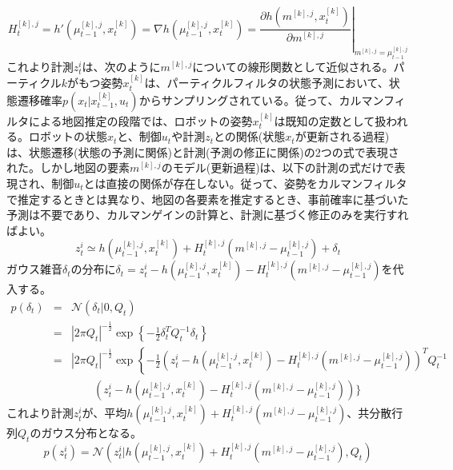 \documentclass[dvipdfmx,a4paper]{jsarticle}
\begin{document}
\begin{equation}
	H_t^{[k], j} = h'(\mu_{t - 1}^{[k], j}, x_t^{[k]}) = \nabla h(\mu_{t - 1}^{[k], j}, x_t^{[k]}) = \left. \frac{\partial h(m^{[k], j}, x_t^{[k]})}{\partial m^{[k], j}} \right|_{m^{[k], j} = \mu_{t - 1}^{[k], j}}
\end{equation}
これより計測$z_t^i$は、次のように$m^{[k], j}$についての線形関数として近似される。パーティクル$k$がもつ姿勢$x_t^{[k]}$は、パーティクルフィルタの状態予測において、状態遷移確率$p(x_t | x_{t - 1}^{[k]}, u_t)$からサンプリングされている。従って、カルマンフィルタによる地図推定の段階では、ロボットの姿勢$x_t^{[k]}$は既知の定数として扱われる。ロボットの状態$x_t$と、制御$u_t$や計測$z_t$との関係(状態$x_t$が更新される過程)は、状態遷移(状態の予測に関係)と計測(予測の修正に関係)の2つの式で表現された。しかし地図の要素$m^{[k], j}$のモデル(更新過程)は、以下の計測の式だけで表現され、制御$u_t$とは直接の関係が存在しない。従って、姿勢をカルマンフィルタで推定するときとは異なり、地図の各要素を推定するとき、事前確率に基づいた予測は不要であり、カルマンゲインの計算と、計測に基づく修正のみを実行すればよい。
\begin{equation}
	z_t^i \simeq h(\mu_{t - 1}^{[k], j}, x_t^{[k]}) + H_t^{[k], j} \left( m^{[k], j} - \mu_{t - 1}^{[k], j} \right) + \delta_t
\end{equation}
ガウス雑音$\delta_t$の分布に$\delta_t = z_t^i - h(\mu_{t - 1}^{[k], j}, x_t^{[k]}) - H_t^{[k], j} \left( m^{[k], j} - \mu_{t - 1}^{[k], j} \right)$を代入する。
\begin{eqnarray}
	p(\delta_t) &=& \mathcal{N}(\delta_t | 0, Q_t) \nonumber \\
	&=& |2 \pi Q_t|^{-\frac{1}{2}} \exp \left\{ -\frac{1}{2} \delta_t^T Q_t^{-1} \delta_t \right\} \nonumber \\
	&=& |2 \pi Q_t|^{-\frac{1}{2}} \exp \left\{ -\frac{1}{2} \left( z_t^i - h(\mu_{t - 1}^{[k], j}, x_t^{[k]}) - H_t^{[k], j} \left( m^{[k], j} - \mu_{t - 1}^{[k], j} \right) \right)^T Q_t^{-1} \right. \nonumber \\
	&& \qquad \left( z_t^i - h(\mu_{t - 1}^{[k], j}, x_t^{[k]}) - H_t^{[k], j} \left( m^{[k], j} - \mu_{t - 1}^{[k], j} \right) \right) \bigg\} \nonumber
\end{eqnarray}
これより計測$z_t^i$が、平均$h(\mu_{t - 1}^{[k], j}, x_t^{[k]}) + H_t^{[k], j} \left( m^{[k], j} - \mu_{t - 1}^{[k], j} \right)$、共分散行列$Q_t$のガウス分布となる。
\begin{equation}
	p(z_t^i) = \mathcal{N} \left( z_t^i | h(\mu_{t - 1}^{[k], j}, x_t^{[k]}) + H_t^{[k], j} \left( m^{[k], j} - \mu_{t - 1}^{[k], j} \right), Q_t \right)
\end{equation}
\end{document}
